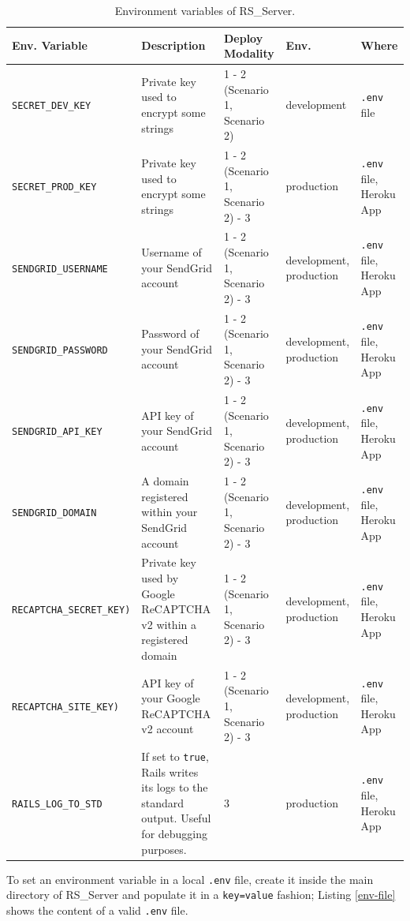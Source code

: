 \documentclass[a4paper, english]{article}
\newcounter{subsubsubsection}[subsubsection]
\begin{document}
\begin{table}
\centering
\begin{threeparttable}
\begin{tabular}{p{3.5cm}p{3cm}p{3cm}p{1.7cm}p{2cm}}
\toprule
\textbf{Env. Variable}  &\textbf{Description} & \textbf{Deploy Modality} & \textbf{Env.} & \textbf{Where} \\
\midrule
\verb|SECRET_DEV_KEY| & Private key used to encrypt some strings & 1 - 2 (Scenario 1, Scenario 2) & development & \verb|.env| file \\
\verb|SECRET_PROD_KEY| & Private key used to encrypt some strings & 1 - 2 (Scenario 1, Scenario 2) - 3 & production & \verb|.env| file, Heroku App \\
\verb|SENDGRID_USERNAME| & Username of your SendGrid account & 1 - 2 (Scenario 1, Scenario 2) - 3 & development, production & \verb|.env| file, Heroku App \\
\verb|SENDGRID_PASSWORD| & Password of your SendGrid account & 1 - 2 (Scenario 1, Scenario 2) - 3 & development, production & \verb|.env| file, Heroku App \\
\verb|SENDGRID_API_KEY| & API key of your SendGrid account & 1 - 2 (Scenario 1, Scenario 2) - 3 & development, production & \verb|.env| file, Heroku App \\
\verb|SENDGRID_DOMAIN| & A domain registered within your SendGrid account & 1 - 2 (Scenario 1, Scenario 2) - 3 & development, production & \verb|.env| file, Heroku App \\
\verb|RECAPTCHA_SECRET_KEY)| & Private key used by Google ReCAPTCHA v2 within a registered domain & 1 - 2 (Scenario 1, Scenario 2) - 3 & development, production & \verb|.env| file, Heroku App \\
\verb|RECAPTCHA_SITE_KEY)| & API key of your Google ReCAPTCHA v2 account & 1 - 2 (Scenario 1, Scenario 2) - 3 & development, production & \verb|.env| file, Heroku App \\
\verb|RAILS_LOG_TO_STD| & If set to \verb|true|, Rails writes its logs to the standard output. Useful for debugging purposes. & 3 & production & \verb|.env| file, Heroku App \\
\bottomrule
\end{tabular}
\caption{Environment variables of RS\_Server.}
\label{env}
 \end{threeparttable}
\end{table}


To set an environment variable in a local \verb|.env| file, create it inside the main directory of RS\_Server and populate it in a \verb|key=value| fashion; Listing \ref{env-file} shows the content of a valid \verb|.env| file.
\end{document}
